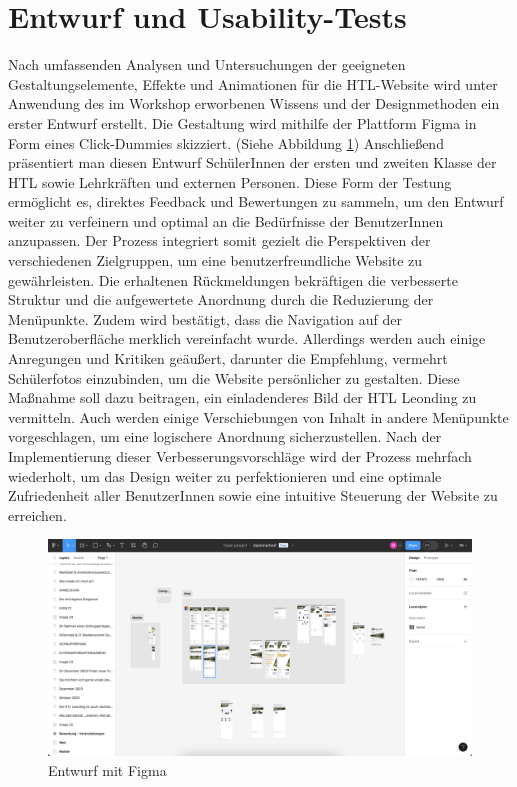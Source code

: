 \section{Entwurf und Usability-Tests}
Nach umfassenden Analysen und Untersuchungen der geeigneten Gestaltungselemente, Effekte und Animationen für die HTL-Website wird unter Anwendung des im Workshop 
erworbenen Wissens und der Designmethoden ein erster Entwurf erstellt. Die Gestaltung wird mithilfe der Plattform Figma in Form eines 
Click-Dummies skizziert. (Siehe Abbildung \ref{fig:impl:figma_entwurf}) Anschließend präsentiert man diesen Entwurf SchülerInnen der ersten und zweiten Klasse der HTL sowie Lehrkräften 
und externen Personen. Diese Form der Testung ermöglicht es, direktes Feedback und Bewertungen zu sammeln, um den Entwurf 
weiter zu verfeinern und optimal an die Bedürfnisse der BenutzerInnen anzupassen. Der Prozess integriert somit gezielt die Perspektiven 
der verschiedenen Zielgruppen, um eine benutzerfreundliche Website zu gewährleisten. 
Die erhaltenen Rückmeldungen bekräftigen die verbesserte Struktur und die aufgewertete Anordnung durch die Reduzierung der Menüpunkte. 
Zudem wird bestätigt, dass die Navigation auf der Benutzeroberfläche merklich vereinfacht wurde. Allerdings werden auch einige Anregungen 
und Kritiken geäußert, darunter die Empfehlung, vermehrt Schülerfotos einzubinden, um die Website persönlicher zu gestalten. Diese Maßnahme 
soll dazu beitragen, ein einladenderes Bild der HTL Leonding zu vermitteln. Auch werden einige Verschiebungen von Inhalt in andere Menüpunkte 
vorgeschlagen, um eine logischere Anordnung sicherzustellen. 
Nach der Implementierung dieser Verbesserungsvorschläge wird der Prozess mehrfach wiederholt, um das Design weiter zu perfektionieren und 
eine optimale Zufriedenheit aller BenutzerInnen sowie eine intuitive Steuerung der Website zu erreichen. 

\begin{figure}
   \begin{minipage}[b]{\linewidth} 
      \includegraphics[width=\linewidth]{pics/figma.png}
      \caption{Entwurf mit Figma}
      \label{fig:impl:figma_entwurf}
   \end{minipage}
   \hspace{.05\linewidth}
\end{figure}

